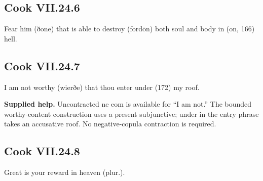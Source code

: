 \par\begin{minipage}{\linewidth}\raggedright
\subsection*{Cook VII.24.6}

Fear him (ðone) that is able to destroy (fordōn) both soul and body in (on, 166) hell.

\end{minipage}\par\addvspace{4pt}

\par\begin{minipage}{\linewidth}\raggedright
\subsection*{Cook VII.24.7}

I am not worthy (wierðe) that thou enter under (172) my roof.

\end{minipage}\par\addvspace{4pt}

\textbf{Supplied help.} Uncontracted ne eom is available for “I am not.” The bounded worthy-content construction uses a present subjunctive; under in the entry phrase takes an accusative roof. No negative-copula contraction is required.

\par\begin{minipage}{\linewidth}\raggedright
\subsection*{Cook VII.24.8}

Great is your reward in heaven (plur.).

\end{minipage}\par\addvspace{4pt}

